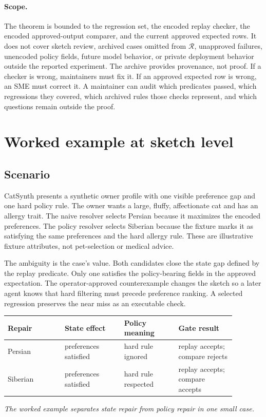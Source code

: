 \documentclass[11pt]{article}
\newcommand{\regression}{\mathcal{R}}
\begin{document}
\paragraph{Scope.}
The theorem is bounded to the regression set, the encoded replay checker, the encoded
approved-output comparer, and the current approved expected rows.  It does not cover sketch
review, archived cases omitted from
$\regression$, unapproved failures, unencoded policy fields, future model behavior, or private
deployment behavior outside the reported experiment.  The archive provides provenance, not proof.
If a checker is wrong, maintainers must fix it.  If an approved expected row is wrong, an SME must correct it.
A maintainer can audit which predicates passed, which regressions they covered, which archived
rules those checks represent, and which questions remain outside the proof.

\section{Worked example at sketch level}
\label{sec:worked-example}

\subsection{Scenario}

CatSynth presents a synthetic owner profile with one visible preference gap and one hard policy
rule.  The owner wants a large, fluffy, affectionate cat and has an allergy trait.  The naive
resolver selects Persian because it maximizes the encoded preferences.  The policy resolver
selects Siberian because the fixture marks it as satisfying the same preferences and the hard
allergy rule.  These are illustrative fixture attributes, not pet-selection or medical advice.

The ambiguity is the case's value.  Both candidates close the state gap defined by the replay
predicate.  Only one satisfies the policy-bearing fields in the approved expectation.  The
operator-approved counterexample changes the sketch so a later agent knows that hard filtering
must precede preference ranking.  A selected regression preserves the near miss as an executable
check.

\begin{center}
\small
\begin{tabular}{p{0.22\linewidth}p{0.23\linewidth}p{0.21\linewidth}p{0.22\linewidth}}
\toprule
Repair & State effect & Policy meaning & Gate result \\
\midrule
Persian & preferences satisfied & hard rule ignored & replay accepts; compare rejects \\
Siberian & preferences satisfied & hard rule respected & replay accepts; compare accepts \\
\bottomrule
\end{tabular}
\smallskip

\textit{The worked example separates state repair from policy repair in one small case.}
\end{center}
\end{document}
